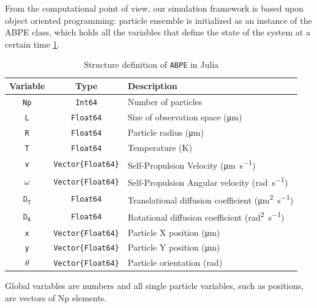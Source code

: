 \documentclass[../../master_thesis_np.tex]{subfiles}
\begin{document}
	From the computational point of view, our simulation framework is based upon object oriented programming: particle ensemble is initialized as an instance of the ABPE class, which holds all the variables that define the state of the system at a certain time \ref{tab:ABPE2}. 
	\begin{table}[h]
		\centering
		\begin{tabular}{c|cl}
			\textbf{Variable} & \textbf{Type} & \textbf{Description} \\
			\hline
			\texttt{Np}  & \texttt{Int64} & Number of particles \\
			\texttt{L}   & \texttt{Float64} & Size of observation space (\unit{\micro\meter}) \\
			\texttt{R}   & \texttt{Float64} & Particle radius (\unit{\micro\meter}) \\
			\texttt{T}   & \texttt{Float64} & Temperature (\unit{\kelvin}) \\
			\texttt{v}   & \texttt{Vector\{Float64\}} & Self-Propulsion Velocity (\unit{\micro\meter\per\second}) \\
			\texttt{$\mathtt{\omega}$}   & \texttt{Vector\{Float64\}} & Self-Propulsion Angular velocity (\unit{\radian\per\second}) \\
			$\mathtt{D_T}$  & \texttt{Float64} & Translational diffusion coefficient (\unit{\square\micro\meter\per\second}) \\
			$\mathtt{D_R}$  & \texttt{Float64} & Rotational diffusion coefficient (\unit{\square\radian\per\second}) \\
			\texttt{x}   & \texttt{Vector\{Float64\}} & Particle X position (\unit{\micro\meter}) \\
			\texttt{y}   & \texttt{Vector\{Float64\}} & Particle Y position (\unit{\micro\meter}) \\
			\texttt{$\mathtt{\theta}$}   & \texttt{Vector\{Float64\}} & Particle orientation (\unit{\radian}) \\
		\end{tabular}
		\caption{Structure definition of \texttt{ABPE} in Julia}
		\label{tab:ABPE2}
	\end{table}
	Global variables are numbers and all single particle variables, such as positions, are vectors of Np elements. %
	
\end{document}
